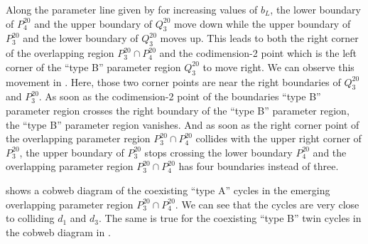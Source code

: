 Along the parameter line given by  for increasing values of $b_L$, the lower boundary of $P^{20}_4$ and the upper boundary of $Q^{20}_3$ move down while the upper boundary of $P^{20}_3$ and the lower boundary of $Q^{20}_3$ moves up.
This leads to both the right corner of the overlapping region $P^{20}_3 \cap P^{20}_4$ and the codimension-2 point which is the left corner of the ``type B'' parameter region $Q^{20}_3$ to move right.
We can observe this movement in .
Here, those two corner points are near the right boundaries of $Q^{20}_3$ and $P^{20}_3$.
As soon as the codimension-2 point of the boundaries ``type B'' parameter region crosses the right boundary of the ``type B'' parameter region, the ``type B'' parameter region vanishes.
And as soon as the right corner point of the overlapping parameter region $P^{20}_3 \cap P^{20}_4$ collides with the upper right corner of $P^{20}_3$, the upper boundary of $P^{20}_3$ stops crossing the lower boundary $P^{20}_4$ and the overlapping parameter region $P^{20}_3 \cap P^{20}_4$ has four boundaries instead of three.

 shows a cobweb diagram of the coexisting ``type A'' cycles in the emerging overlapping parameter region $P^{20}_3 \cap P^{20}_4$.
We can see that the cycles are very close to colliding $d_1$ and $d_3$.
The same is true for the coexisting ``type B'' twin cycles in the cobweb diagram in .
